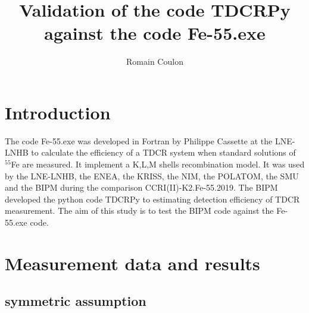 \documentclass[12pt]{iopart}
\begin{document}
\title[Draft - May 2023]{Validation of the code TDCRPy against the code Fe-55.exe}
\author{Romain Coulon}
\address{Bureau International des Poids et Mesures, Pavillon de Breteuil, F-92312 S\`{e}vres Cedex, France.}


\section{Introduction}

The code Fe-55.exe was developed in Fortran by Philippe Cassette at the LNE-LNHB to calculate the efficiency of a TDCR system when standard solutions of $^{55}$Fe are measured. It implement a K,L,M shells recombination model. It was used by the LNE-LNHB, the ENEA, the KRISS, the NIM, the POLATOM, the SMU and the BIPM during the comparison CCRI(II)-K2.Fe-55.2019. The BIPM developed the python code TDCRPy to estimating detection efficiency of TDCR measurement. The aim of this study is to test the BIPM code against the Fe-55.exe code.\\


\section{Measurement data and results}
\subsection{symmetric assumption}
\end{document}
